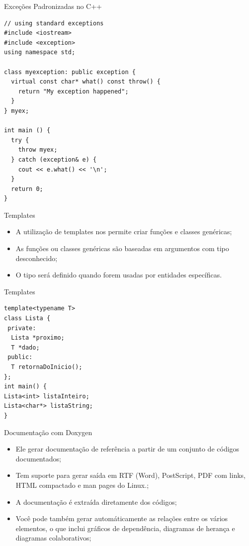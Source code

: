 \documentclass[12pt,table,xcolor={dvipsnames}]{beamer}
\begin{document}
\begin{frame}[fragile]{Exceções Padronizadas no C++}
\begin{lstlisting}
// using standard exceptions
#include <iostream>
#include <exception>
using namespace std;

class myexception: public exception {
  virtual const char* what() const throw() {
    return "My exception happened";
  }
} myex;

int main () {
  try {
    throw myex;
  } catch (exception& e) {
    cout << e.what() << '\n';
  }
  return 0;
}
\end{lstlisting}
\end{frame}

\begin{frame}{Templates}
\begin{itemize}
\item A utilização de templates nos permite criar funções e classes genéricas;
\item As funções ou classes genéricas são baseadas em argumentos com tipo desconhecido;
\item O tipo será definido quando forem usadas por entidades específicas.
\end{itemize}
\end{frame}

\begin{frame}[fragile]{Templates}
\begin{lstlisting}
template<typename T>
class Lista {
 private:
  Lista *proximo;
  T *dado;
 public:
  T retornaDoInicio();
};
int main() {
Lista<int> listaInteiro;
Lista<char*> listaString;
}
\end{lstlisting}
\end{frame}

\begin{frame}{Documentação com Doxygen}
\begin{itemize}
\item  Ele gerar  documentação de referência a partir de um conjunto de códigos documentados;
\item  Tem suporte para gerar saída em RTF (Word), PostScript, PDF com links, HTML compactado e man pages do Linux.;
\item A documentação é extraída diretamente dos códigos;
\item Você pode também gerar automáticamente as relações entre os vários elementos, o que inclui gráficos de dependência, diagramas de herança e diagramas colaborativos;
\end{itemize}
\end{frame}
\end{document}
